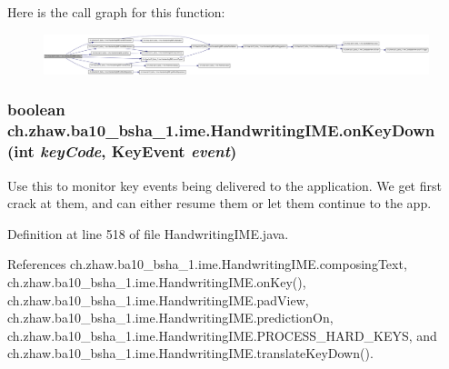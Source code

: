 Here is the call graph for this function:\nopagebreak
\begin{figure}[H]
\begin{center}
\leavevmode
\includegraphics[width=420pt]{classch_1_1zhaw_1_1ba10__bsha__1_1_1ime_1_1HandwritingIME_a6bf7a6751794c5bf24f686cbf94d7ebf_cgraph}
\end{center}
\end{figure}
\hypertarget{classch_1_1zhaw_1_1ba10__bsha__1_1_1ime_1_1HandwritingIME_a999c8827bbffc0388be05c9e87e2ac49}{
\subsubsection[{onKeyDown}]{\setlength{\rightskip}{0pt plus 5cm}boolean ch.zhaw.ba10\_\-bsha\_\-1.ime.HandwritingIME.onKeyDown (int {\em keyCode}, \/  KeyEvent {\em event})}}
\label{classch_1_1zhaw_1_1ba10__bsha__1_1_1ime_1_1HandwritingIME_a999c8827bbffc0388be05c9e87e2ac49}
Use this to monitor key events being delivered to the application. We get first crack at them, and can either resume them or let them continue to the app. 

Definition at line 518 of file HandwritingIME.java.

References ch.zhaw.ba10\_\-bsha\_\-1.ime.HandwritingIME.composingText, ch.zhaw.ba10\_\-bsha\_\-1.ime.HandwritingIME.onKey(), ch.zhaw.ba10\_\-bsha\_\-1.ime.HandwritingIME.padView, ch.zhaw.ba10\_\-bsha\_\-1.ime.HandwritingIME.predictionOn, ch.zhaw.ba10\_\-bsha\_\-1.ime.HandwritingIME.PROCESS\_\-HARD\_\-KEYS, and ch.zhaw.ba10\_\-bsha\_\-1.ime.HandwritingIME.translateKeyDown().

